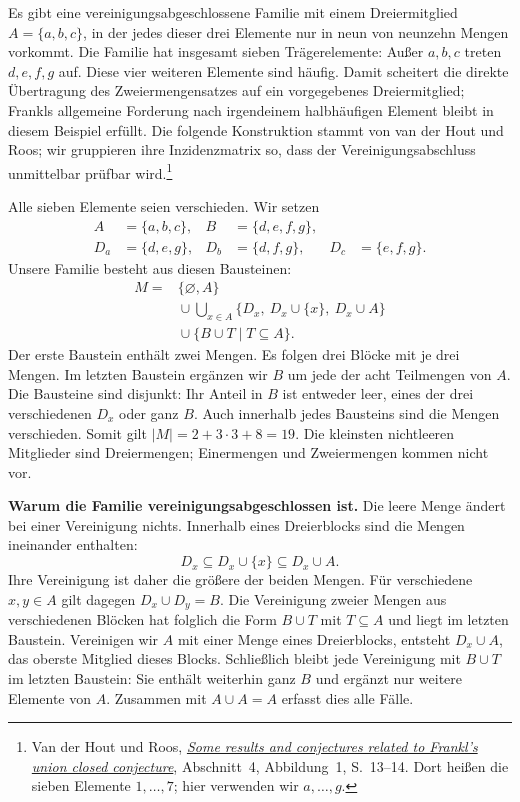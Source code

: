 Es gibt eine vereinigungsabgeschlossene Familie mit einem
Dreiermitglied \(A=\{a,b,c\}\), in der jedes dieser drei
Elemente nur in neun von neunzehn Mengen vorkommt. Die Familie
hat insgesamt sieben Trägerelemente: Außer \(a,b,c\) treten
\(d,e,f,g\) auf. Diese vier weiteren Elemente sind häufig.
Damit scheitert die direkte Übertragung des Zweiermengensatzes
auf ein vorgegebenes Dreiermitglied; Frankls allgemeine
Forderung nach irgendeinem halbhäufigen Element bleibt in
diesem Beispiel erfüllt. Die folgende Konstruktion stammt
von van der Hout und Roos; wir gruppieren ihre Inzidenzmatrix
so, dass der Vereinigungsabschluss unmittelbar prüfbar wird.\footnote{Van der
Hout und Roos, \href{https://doi.org/10.23952/jano.8.2026.1.02}{\emph{Some results
and conjectures related to Frankl's union closed conjecture}},
Abschnitt~4, Abbildung~1, S.~13--14. Dort heißen die sieben
Elemente \(1,\ldots,7\); hier verwenden wir \(a,\ldots,g\).}

Alle sieben Elemente seien verschieden. Wir setzen
\[
  \begin{aligned}
    A&=\{a,b,c\}, & B&=\{d,e,f,g\},\\
    D_a&=\{d,e,g\}, &D_b&=\{d,f,g\}, &D_c&=\{e,f,g\}.
  \end{aligned}
\]
Unsere Familie besteht aus diesen Bausteinen:
\[
  \begin{aligned}
    M={}&\{\varnothing,A\}\\
       &{}\cup\bigcup_{x\in A}\{D_x,\ D_x\cup\{x\},\ D_x\cup A\}\\
       &{}\cup\{B\cup T\mid T\subseteq A\}.
  \end{aligned}
\]
Der erste Baustein enthält zwei Mengen. Es folgen drei
Blöcke mit je drei Mengen. Im letzten Baustein ergänzen wir
\(B\) um jede der acht Teilmengen von \(A\). Die Bausteine
sind disjunkt: Ihr Anteil in \(B\) ist entweder leer,
eines der drei verschiedenen \(D_x\) oder ganz \(B\).
Auch innerhalb jedes Bausteins sind die Mengen verschieden.
Somit gilt \(|M|=2+3\cdot3+8=19\). Die kleinsten
nichtleeren Mitglieder sind Dreiermengen; Einermengen und
Zweiermengen kommen nicht vor.

\FranklRareTripleTable

\medskip\noindent\textbf{Warum die Familie vereinigungsabgeschlossen ist.}
Die leere Menge ändert bei einer Vereinigung nichts.
Innerhalb eines Dreierblocks sind die Mengen ineinander
enthalten:
\[
  D_x\subseteq D_x\cup\{x\}\subseteq D_x\cup A.
\]
Ihre Vereinigung ist daher die größere der beiden Mengen.
Für verschiedene \(x,y\in A\) gilt dagegen
\(D_x\cup D_y=B\). Die Vereinigung zweier Mengen aus
verschiedenen Blöcken hat folglich die Form \(B\cup T\)
mit \(T\subseteq A\) und liegt im letzten Baustein.
Vereinigen wir \(A\) mit einer Menge eines Dreierblocks,
entsteht \(D_x\cup A\), das oberste Mitglied dieses Blocks.
Schließlich bleibt jede Vereinigung mit \(B\cup T\)
im letzten Baustein: Sie enthält weiterhin ganz \(B\)
und ergänzt nur weitere Elemente von \(A\).
Zusammen mit \(A\cup A=A\) erfasst dies alle Fälle.

